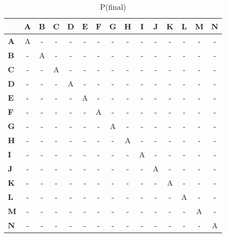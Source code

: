 \documentclass{article}
\begin{document}
\begin{table}[H]\centering
\caption{P(final)}
\begin{tabular}{l c c c c c c c c c c c c c c}
\toprule
 & \textbf{A} & \textbf{B} & \textbf{C} & \textbf{D} & \textbf{E} & \textbf{F} & \textbf{G} & \textbf{H} & \textbf{I} & \textbf{J} & \textbf{K} & \textbf{L} & \textbf{M} & \textbf{N}\\\midrule
\textbf{A} & A & - & - & - & - & - & - & - & - & - & - & - & - & - \\
\textbf{B} & - & A & - & - & - & - & - & - & - & - & - & - & - & - \\
\textbf{C} & - & - & A & - & - & - & - & - & - & - & - & - & - & - \\
\textbf{D} & - & - & - & A & - & - & - & - & - & - & - & - & - & - \\
\textbf{E} & - & - & - & - & A & - & - & - & - & - & - & - & - & - \\
\textbf{F} & - & - & - & - & - & A & - & - & - & - & - & - & - & - \\
\textbf{G} & - & - & - & - & - & - & A & - & - & - & - & - & - & - \\
\textbf{H} & - & - & - & - & - & - & - & A & - & - & - & - & - & - \\
\textbf{I} & - & - & - & - & - & - & - & - & A & - & - & - & - & - \\
\textbf{J} & - & - & - & - & - & - & - & - & - & A & - & - & - & - \\
\textbf{K} & - & - & - & - & - & - & - & - & - & - & A & - & - & - \\
\textbf{L} & - & - & - & - & - & - & - & - & - & - & - & A & - & - \\
\textbf{M} & - & - & - & - & - & - & - & - & - & - & - & - & A & - \\
\textbf{N} & - & - & - & - & - & - & - & - & - & - & - & - & - & A \\
\bottomrule
\end{tabular}
\end{table}
\end{document}

